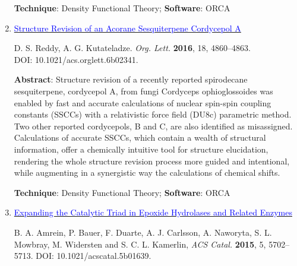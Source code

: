 \documentclass[10pt]{article}
\begin{document}
\begin{enumerate}
          \textbf{Technique}: Density Functional Theory;  \textbf{Software}: {ORCA}

          \vspace{0.5cm}

    \item \href{https://doi.org/10.1021/acs.orglett.6b02341}{\textcolor{blue}{Structure Revision of an Acorane Sesquiterpene Cordycepol A}}

          D. S. Reddy, A. G. Kutateladze. {\it Org. Lett.} {\bf 2016}, 18, 4860--4863.\\DOI: 10.1021/acs.orglett.6b02341.
 
          \textbf{Abstract}: Structure revision of a recently reported spirodecane sesquiterpene, cordycepol A, from fungi Cordyceps ophioglossoides was enabled by fast and accurate calculations of nuclear spin-spin coupling constants (SSCCs) with a relativistic force field (DU8c) parametric method. Two other reported cordycepols, B and C, are also identified as misassigned. Calculations of accurate SSCCs, which contain a wealth of structural information, offer a chemically intuitive tool for structure elucidation, rendering the whole structure revision process more guided and intentional, while augmenting in a synergistic way the calculations of chemical shifts.

          \textbf{Technique}: Density Functional Theory; \textbf{Software}: {ORCA}

          \vspace{0.5cm}
  
    \item \href{https://doi.org/10.1021/acscatal.5b01639}{\textcolor{blue}{Expanding the Catalytic Triad in Epoxide Hydrolases and Related Enzymes}}

          B. A. Amrein, P. Bauer, F. Duarte, A. J. Carlsson, A. Naworyta, S. L. Mowbray, M. Widersten and S. C. L. Kamerlin, {\it ACS Catal.} {\bf 2015}, 5, 5702--5713. DOI: 10.1021/acscatal.5b01639.


\end{enumerate}
\end{document}
